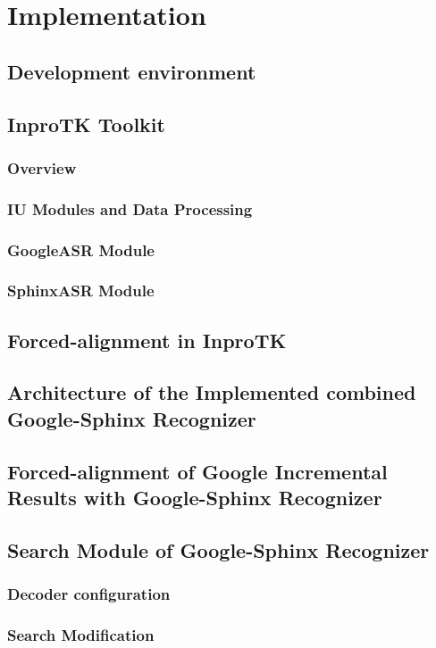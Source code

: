 \chapter{Implementation}
\label{chap:implem}
\section {Development environment}
\section {InproTK Toolkit}
\subsection {Overview}
\subsection {IU Modules and Data Processing}
\subsection {GoogleASR Module}
\subsection {SphinxASR Module}
\section {Forced-alignment in InproTK}
\section {Architecture of the Implemented combined Google-Sphinx Recognizer}
\section {Forced-alignment of Google Incremental Results with Google-Sphinx
Recognizer}
\section {Search Module of Google-Sphinx Recognizer}
\subsection {Decoder configuration}
\subsection {Search Modification}